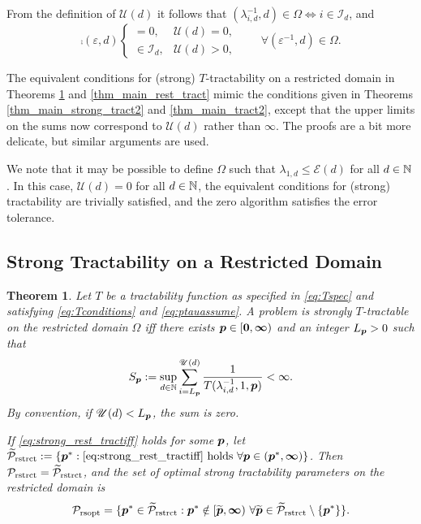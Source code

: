 \documentclass[sort&compress]{elsarticle}
\newcommand{\theM}{\mathscr{E}}
\newcommand{\theUB}{\mathscr{U}}
\renewcommand{\hI}{\mathcal{I}}
\newtheorem{theorem}{Theorem}
\begin{document}
From the definition of $\theUB(d)$ it follows that $(\lambda_{i,d}^{-1},d) \in \Omega  \iff i \in \hI_d$, and
\begin{equation} \label{eq:comprestr}
  \comp(\varepsilon,d) \begin{cases}
= 0, & \theUB(d) = 0, \\
    \in \hI_d, & \theUB(d) > 0,
\end{cases}
\qquad \forall (\varepsilon^{-1},d) \in \Omega.
\end{equation}


The equivalent conditions for (strong) $T$-tractability on a restricted domain in Theorems \ref{thm_main_rest_strong_tract} and \ref{thm_main_rest_tract} mimic the conditions given in Theorems \ref{thm_main_strong_tract2} and \ref{thm_main_tract2}, except that the upper limits on the sums now correspond to $\theUB(d)$ rather than $\infty$.  The proofs are a bit more delicate, but similar arguments are used.

We note that it may be possible to define $\Omega$ such that  $\lambda_{1,d} \le \theM(d)$
for all $d \in \mathbb{N}$. In this case, $\theUB(d) = 0$ for all $d \in \mathbb{N}$, the equivalent conditions for (strong) tractability are trivially satisfied, and the zero algorithm satisfies the error tolerance.

\subsection{Strong Tractability on a Restricted Domain}

\begin{theorem}\label{thm_main_rest_strong_tract}
Let $T$ be a tractability function as specified in \eqref{eq:Tspec} and satisfying \eqref{eq:Tconditions} and \eqref{eq:ptauassume}.  A problem is strongly $T$-tractable \emph{on the restricted domain $\Omega$} iff there exists $\boldsymbol{p} \in [\boldsymbol{0}, \boldsymbol{\infty})$ and an integer $L_{\boldsymbol{p}} > 0$ such that
\begin{equation} \label{eq:strong_rest_tractiff}
     S_{\vp}:=\sup_{d \in \naturals} \sum_{i = L_{\vp}}^{\theUB(d)} \frac{1}{T(\lambda_{i,d}^{-1},1,\vp)} < \infty.
\end{equation}
By convention, if $\theUB(d) < L_{\vp}$, the sum is zero.

If \eqref{eq:strong_rest_tractiff} holds for some $\boldsymbol{p}$, let  $\widetilde{\mathcal{P}}_{\textup{rstrct}} : = \{\boldsymbol{p}^* : \eqref{eq:strong_rest_tractiff} \text{ holds }\forall \boldsymbol{p} \in (\boldsymbol{p}^*,\boldsymbol{\infty})\}$.  Then $\mathcal{P}_{\textup{rstrct}} = \widetilde{\mathcal{P}}_{\textup{rstrct}}$, and the set of optimal strong tractability parameters on the restricted domain is
\[
	\mathcal{P}_{\textup{rsopt}} =
	\{\boldsymbol{p}^* \in \widetilde{\mathcal{P}}_{\textup{rstrct}} :  \boldsymbol{p}^* \notin [\widetilde{\boldsymbol{p}},\boldsymbol{\infty}) \ \forall \widetilde{\boldsymbol{p}}\in  \widetilde{\mathcal{P}}_{\textup{rstrct}} \setminus \{\boldsymbol{p}^*\} \}.
\]
\end{theorem}
\end{document}
